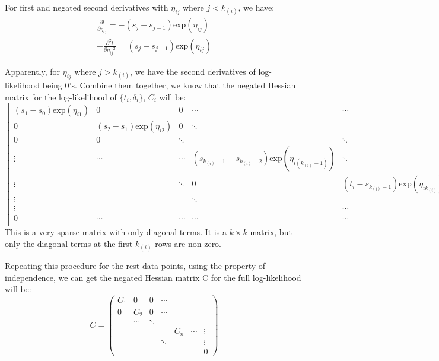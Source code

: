 \documentclass[]{article}
\begin{document}
For first and negated second derivatives with \(\eta_{ij}\) where
\(j<k_{(i)}\), we have:
\begin{equation}\begin{aligned}\label{eqn:hessian2}
\frac{\partial l}{\partial \eta_{ij}}= -(s_{j}-s_{j-1})\text{exp}(\eta_{ij})\\
-\frac{\partial^2 l}{\partial {\eta_{ij}}^2} = (s_{j}-s_{j-1})\text{exp}(\eta_{ij})
\end{aligned}\end{equation}

Apparently, for \(\eta_{ij}\) where \(j>k_{(i)}\), we have the second
derivatives of log-likelihood being 0's. Combine them together, we know
that the negated Hessian matrix for the log-likelihood of
\(\{t_i,\delta_i\}\), \(C_i\) will be: \begin{equation}
\begin{bmatrix}
(s_1-s_0)\text{exp}(\eta_{i1})  & 0  & 0 & \cdots & \cdots & \cdots & 0 \\
0  & (s_2-s_1)\text{exp}(\eta_{i2})  & 0  & \ddots & && &  \\
0 & 0  & \ddots &   & \ddots & &  &  \\
\vdots & \cdots & \cdots & (s_{k_{(i)}-1}-s_{k_{(i)}-2})\text{exp}(\eta_{i(k_{(i)}-1)}) & \ddots & \vdots &  &  \\
\vdots & & \ddots & 0 & (t_i-s_{k_{(i)}-1})\text{exp}(\eta_{ik_{(i)}}) & \cdots & \vdots& \\
\vdots  & & & \ddots &   & \ddots  &  \vdots\\
\vdots  & && & \cdots & \cdots & \vdots\\
0 & \cdots &  \cdots & \cdots & \cdots & \cdots & 0\\
\end{bmatrix}
\end{equation} This is a very sparse matrix with only diagonal terms. It
is a \(k\times k\) matrix, but only the diagonal terms at the first
\(k_{(i)}\) rows are non-zero.

Repeating this procedure for the rest data points, using the property of
independence, we can get the negated Hessian matrix C for the full
log-likelihood will be: \begin{equation}
C = \begin{pmatrix} 
C_1 & 0 & 0 & \cdots & & \\ 
0 & C_2 & 0 & \cdots & & \\
  & \cdots & \ddots &  & & \\
& & & & C_n & \cdots & \vdots \\ 
& & & \ddots & &&\vdots \\
& & & & & & 0
\end{pmatrix}
\end{equation}
\end{document}
